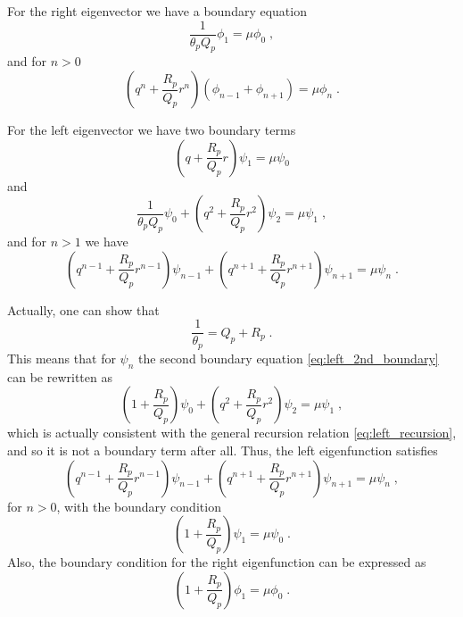 \documentclass[a4paper,10pt]{article}
\begin{document}
For the right eigenvector we have a boundary equation
\begin{equation}
 \frac{1}{\theta_p Q_p} \phi_1 = \mu \phi_0 \;, 
\end{equation}
and for $n>0$
\begin{equation}
 \left( q^n + \frac{R_p}{Q_p} r^n \right) \left( \phi_{n-1} + \phi_{n+1} \right) = \mu \phi_n \;. 
\end{equation}

For the left eigenvector we have two boundary terms
\begin{equation}
 \left( q + \frac{R_p}{Q_p} r \right) \psi_1 = \mu \psi_0 
\end{equation}
and
\begin{equation}\label{eq:left_2nd_boundary}
 \frac{1}{\theta_p Q_p} \psi_0 + \left( q^2 + \frac{R_p}{Q_p} r^2 \right) \psi_2= \mu \psi_1 \;, 
\end{equation}
and for $n > 1$ we have
\begin{equation}\label{eq:left_recursion}
 \left( q^{n-1} + \frac{R_p}{Q_p} r^{n-1} \right) \psi_{n-1} + \left( q^{n+1} + \frac{R_p}{Q_p} r^{n+1} \right) \psi_{n+1} = \mu \psi_n \;. 
\end{equation}

Actually, one can show that
\begin{equation}
  \frac{1}{\theta_p} = Q_p + R_p \;.
\end{equation}
This means that for $\psi_n$ the second boundary equation \eqref{eq:left_2nd_boundary} can be rewritten as
\begin{equation}
  \left( 1 + \frac{R_p}{Q_p} \right) \psi_0 + \left( q^2 + \frac{R_p}{Q_p} r^2 \right) \psi_2= \mu \psi_1 \;, 
\end{equation}
which is actually consistent with the general recursion relation \eqref{eq:left_recursion}, and so it is not a boundary term after all. Thus, the left eigenfunction satisfies
\begin{equation}
 \left( q^{n-1} + \frac{R_p}{Q_p} r^{n-1} \right) \psi_{n-1} + \left( q^{n+1} + \frac{R_p}{Q_p} r^{n+1} \right) \psi_{n+1} = \mu \psi_n \;,
\end{equation}
for $n>0$, with the boundary condition
\begin{equation}
 \left( 1 + \frac{R_p}{Q_p} \right) \psi_1 = \mu \psi_0 \;.
\end{equation}
Also, the boundary condition for the right eigenfunction can be expressed as
\begin{equation}
  \left( 1 + \frac{R_p}{Q_p} \right) \phi_1 = \mu \phi_0 \;. 
\end{equation}
\end{document}
